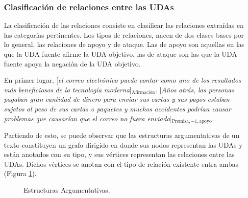 \subsubsection{Clasificación de relaciones entre las UDAs}

La clasificación de las relaciones consiste en clasificar las relaciones extraídas en las categorías pertinentes.
Los tipos de relaciones, nacen de dos clases bases por lo general, las relaciones de apoyo y de ataque.
Las de apoyo son aquellas en las que la UDA fuente afirme la UDA objetivo, las de ataque son 
las que la UDA fuente apoya la negación de la UDA objetivo.

\begin{adjustwidth}{25pt}{25pt}
    En primer lugar, [\emph{el correo electrónico puede contar como uno de los resultados
    más beneficiosos de la tecnología moderna}]$_{\mathrm{Afirmación}}$. [\emph{Años atrás, las personas pagaban gran cantidad de dinero para 
    enviar sus cartas y sus pagos estaban sujetos al peso de sus cartas o paquetes y muchos accidentes podrían 
    causar problemas que causarían que el correo no fuera enviado}]$_{\mathrm{Premisa, -1, apoyo}}$.
\end{adjustwidth}

Partiendo de esto, se puede observar que las estructuras argumentativas de un texto constituyen un grafo dirigido 
en donde sus nodos representan las UDAs y están anotados con su tipo, y sus vértices representan las 
relaciones entre las UDAs. Dichos vértices se anotan con el tipo de relación existente entra ambas 
(Figura \ref{fig:arg_struct}).

\begin{figure}[h!]
	\begin{center}
		\begin{center}
            
        \end{center}
	    \caption{Estructuras Argumentativas.}
        \label{fig:arg_struct}
	\end{center}
\end{figure}
